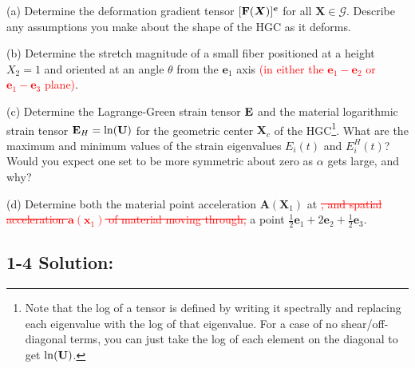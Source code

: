 \medskip
(a) Determine the deformation gradient tensor $[\mathbf{F}(\bm{X})]^{\bm{e}}$ for all $\bm{X}\in \mathcal{G}$. 
Describe any assumptions you make about the shape of the HGC as it deforms. 

\medskip
(b) Determine the stretch magnitude of a small fiber positioned at a height $X_2 = 1$ and oriented at an angle $\theta$ from the $\bm{e}_1$ axis \textcolor{red}{(in either the $\bm{e}_1- \bm{e}_2$ or $\bm{e}_1- \bm{e}_3$ plane)}. 

\medskip
(c) Determine the Lagrange-Green strain tensor $\mathbf{E}$ and the material logarithmic strain tensor $\mathbf{E}_H = \ln (\mathbf{U})$ for the geometric center $\bm{X}_c$ of the HGC\footnote{Note that the log of a tensor is defined by writing it spectrally and replacing each eigenvalue with the log of that eigenvalue. For a case of no shear/off-diagonal terms, you can just take the log of each element on the diagonal to get $\ln(\mathbf{U})$.}. 
What are the maximum and minimum values of the strain eigenvalues $E_i(t)$ and $E_i^H(t)$? 
Would you expect one set to be more symmetric about zero as $\alpha$ gets large, and why?

\medskip
(d) Determine both the material point acceleration $\bm{A}(\bm{X}_1)$ at \textcolor{red}{\sout{, and spatial acceleration $\bm{a}(\bm{x}_1)$ of material moving through,}} a point $\frac{1}{2} \bm{e}_1 + 2\bm{e}_2 + \frac{1}{2} \bm{e}_3$.  

\begin{figure}
\centering
{}
\end{figure}

\subsection*{\textbf{1-4 Solution:}}

